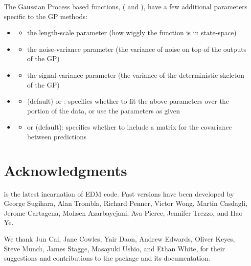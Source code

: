 \documentclass[article]{jss}
\begin{document}
The Gaussian Process based functions, ( and ), have a few additional parameters specific to the GP methods:

\begin{itemize}
\item {}
  \begin{itemize}
  \item the length-scale parameter (how wiggly the function is in state-space)
  \end{itemize}
\item {}
  \begin{itemize}
  \item the noise-variance parameter (the variance of noise on top of the outputs of the GP)
  \end{itemize}
\item {}
  \begin{itemize}
  \item the signal-variance parameter (the variance of the deterministic skeleton of the GP)
  \end{itemize}
\item {}
  \begin{itemize}
  \item {} (default) or : specifies whether to fit the above parameters over the  portion of the data, or use the parameters as given
  \end{itemize}
\item {}
  \begin{itemize}
  \item {} or  (default): specifies whether to include a matrix for the covariance between predictions
  \end{itemize}
\end{itemize}

\section{Acknowledgments}\label{sec:acknowledgments}

 is the latest incarnation of EDM code. Past versions have been developed by George Sugihara, Alan Trombla, Richard Penner, Victor Wong, Martin Casdagli, Jerome Cartagena, Mohsen Azarbayejani, Ava Pierce, Jennifer Trezzo, and Hao Ye.

We thank Jun Cai, Jane Cowles, Yair Daon, Andrew Edwards, Oliver Keyes, Steve Munch, James Stagge, Masayuki Ushio, and Ethan White, for their suggestions and contributions to the package and its documentation.
\end{document}
